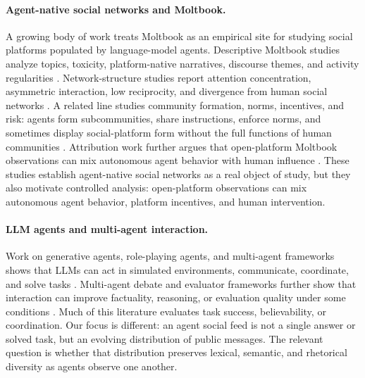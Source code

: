 \documentclass[11pt]{article}
\begin{document}
\paragraph{Agent-native social networks and Moltbook.}
A growing body of work treats Moltbook as an empirical site for studying social platforms populated by language-model agents. Descriptive Moltbook studies analyze topics, toxicity, platform-native narratives, discourse themes, and activity regularities \citep{jiang2026moltbook,demarzo2026moltbook,li2026moltbook}. Network-structure studies report attention concentration, asymmetric interaction, low reciprocity, and divergence from human social networks \citep{price2026moltbook,houji2026moltbook}. A related line studies community formation, norms, incentives, and risk: agents form subcommunities, share instructions, enforce norms, and sometimes display social-platform form without the full functions of human communities \citep{lin2026siliconsociology,manik2026openclaw,feng2026moltnet,zerhoudi2026form}. Attribution work further argues that open-platform Moltbook observations can mix autonomous agent behavior with human influence \citep{li2026illusion}. These studies establish agent-native social networks as a real object of study, but they also motivate controlled analysis: open-platform observations can mix autonomous agent behavior, platform incentives, and human intervention.

\paragraph{LLM agents and multi-agent interaction.}
Work on generative agents, role-playing agents, and multi-agent frameworks shows that LLMs can act in simulated environments, communicate, coordinate, and solve tasks \citep{park2023generative,li2023camel,chen2023agentverse,wu2023autogen,hong2023metagpt,qian2024chatdev,zhou2024sotopia}. Multi-agent debate and evaluator frameworks further show that interaction can improve factuality, reasoning, or evaluation quality under some conditions \citep{du2023debate,chen2024reconcile,chan2024chateval}. Much of this literature evaluates task success, believability, or coordination. Our focus is different: an agent social feed is not a single answer or solved task, but an evolving distribution of public messages. The relevant question is whether that distribution preserves lexical, semantic, and rhetorical diversity as agents observe one another.
\end{document}
